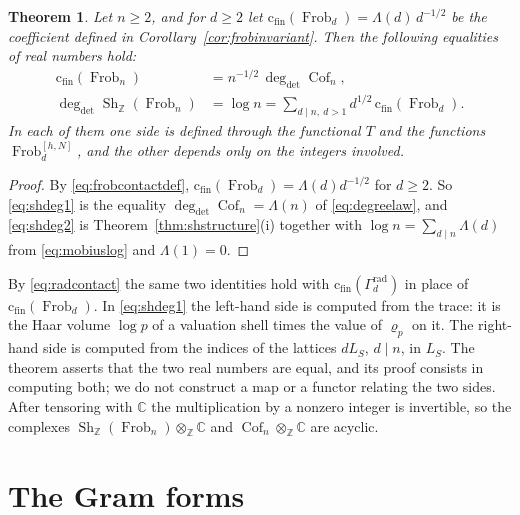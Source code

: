 \documentclass[11pt]{amsart}
\newtheorem{theorem}{Theorem}[section]
\theoremstyle{definition}
\newcommand{\C}{\mathbb C}
\newcommand{\Z}{\mathbb Z}
\newcommand{\Frob}{\operatorname{Frob}}
\newcommand{\Sh}{\operatorname{Sh}}
\newcommand{\Prim}{\operatorname{Cof}}
\newcommand{\degdet}{\operatorname{deg}_{\mathrm{det}}}
\newcommand{\cfin}{\mathrm{c}_{\mathrm{fin}}}
\begin{document}
\begin{theorem}\label{thm:shdegrees}
Let $n\ge2$, and for $d\ge2$ let $\cfin(\Frob_d)=\Lambda(d)\,d^{-1/2}$ be the
coefficient defined in Corollary~\ref{cor:frobinvariant}. Then the following
equalities of real numbers hold:
\begin{align}
  \cfin(\Frob_n)&=n^{-1/2}\,\degdet\Prim_n,\label{eq:shdeg1}\\
  \degdet\Sh_\Z(\Frob_n)&=\log n
    =\sum_{d\mid n,\ d>1}d^{1/2}\,\cfin(\Frob_d).\label{eq:shdeg2}
\end{align}
In each of them one side is defined through the functional $T$ and the
functions $\Frob_d^{[h,N]}$, and the other depends only on the integers
involved.
\end{theorem}

\begin{proof}
By \eqref{eq:frobcontactdef}, $\cfin(\Frob_d)=\Lambda(d)d^{-1/2}$ for
$d\ge2$.  So \eqref{eq:shdeg1} is the equality $\degdet\Prim_n=\Lambda(n)$ of
\eqref{eq:degreelaw}, and \eqref{eq:shdeg2} is
Theorem~\ref{thm:shstructure}(i) together with
$\log n=\sum_{d\mid n}\Lambda(d)$ from \eqref{eq:mobiuslog} and
$\Lambda(1)=0$.
\end{proof}

By \eqref{eq:radcontact} the same two identities hold with
$\cfin(\Gamma_d^{\mathrm{rad}})$ in place of $\cfin(\Frob_d)$.  In
\eqref{eq:shdeg1} the left-hand side is computed from the trace: it is the
Haar volume $\log p$ of a valuation shell times the value of $\varrho_p$ on
it.  The right-hand side is computed from the indices of the lattices
$dL_S$, $d\mid n$, in $L_S$.  The theorem asserts that the two real numbers
are equal, and its proof consists in computing both; we do not construct a
map or a functor relating the two sides.  After tensoring with $\C$ the
multiplication by a nonzero integer is invertible, so the complexes
$\Sh_\Z(\Frob_n)\otimes_\Z\C$ and $\Prim_n\otimes_\Z\C$ are acyclic.

\section{The Gram forms}\label{sec:gram}
\end{document}
